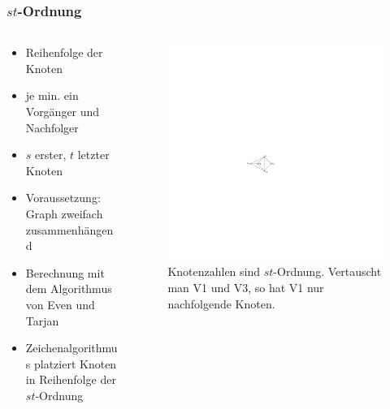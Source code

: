 \documentclass{beamer}
\begin{document}
\begin{frame}
  \frametitle{$st$-Ordnung}
\begin{columns}[c]
\begin{column}{5cm}
  \begin{itemize}[<+->]
    \item Reihenfolge der Knoten
    \item je min. ein Vorgänger und Nachfolger
    \item $s$ erster, $t$ letzter Knoten
    \item Voraussetzung: Graph zweifach zusammenhängend
    \item Berechnung mit dem Algorithmus von Even und Tarjan~\cite{even+tarjan-75}
    \item Zeichenalgorithmus platziert Knoten in Reihenfolge der $st$-Ordnung
  \end{itemize}
\end{column}
\begin{column}{5cm}
        \begin{figure}[h]
                \centering
                \includegraphics[width=1\textwidth]{exampleA/straightline}
                \caption{Knotenzahlen sind $st$-Ordnung. Vertauscht man V1 und V3, so hat V1 nur nachfolgende Knoten. }
                \label{fig:exampleAstraightline}
        \end{figure}
\end{column}
\end{columns}
\end{frame}
\end{document}
